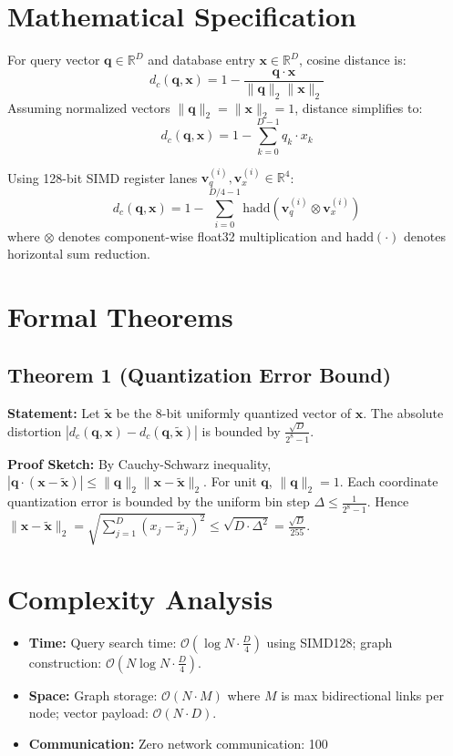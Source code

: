 \documentclass[10pt,journal,compsoc]{IEEEtran}
\begin{document}
\section{Mathematical Specification}
For query vector $\mathbf{q} \in \mathbb{R}^D$ and database entry $\mathbf{x} \in \mathbb{R}^D$, cosine distance is:
$$d_c(\mathbf{q}, \mathbf{x}) = 1 - \frac{\mathbf{q} \cdot \mathbf{x}}{\|\mathbf{q}\|_2 \|\mathbf{x}\|_2}$$
Assuming normalized vectors $\|\mathbf{q}\|_2 = \|\mathbf{x}\|_2 = 1$, distance simplifies to:
$$d_c(\mathbf{q}, \mathbf{x}) = 1 - \sum_{k=0}^{D-1} q_k \cdot x_k$$

Using 128-bit SIMD register lanes $\mathbf{v}_q^{(i)}, \mathbf{v}_x^{(i)} \in \mathbb{R}^4$:
$$d_c(\mathbf{q}, \mathbf{x}) = 1 - \sum_{i=0}^{D/4 - 1} \text{hadd}\left( \mathbf{v}_q^{(i)} \otimes \mathbf{v}_x^{(i)} \right)$$
where $\otimes$ denotes component-wise float32 multiplication and $\text{hadd}(\cdot)$ denotes horizontal sum reduction.

\section{Formal Theorems}
\subsection{Theorem 1 (Quantization Error Bound)}
\textbf{Statement:} Let $\tilde{\mathbf{x}}$ be the 8-bit uniformly quantized vector of $\mathbf{x}$. The absolute distortion $|d_c(\mathbf{q}, \mathbf{x}) - d_c(\mathbf{q}, \tilde{\mathbf{x}})|$ is bounded by $\frac{\sqrt{D}}{2^8 - 1}$.

\textbf{Proof Sketch:} By Cauchy-Schwarz inequality, $|\mathbf{q} \cdot (\mathbf{x} - \tilde{\mathbf{x}})| \le \|\mathbf{q}\|_2 \|\mathbf{x} - \tilde{\mathbf{x}}\|_2$. For unit $\mathbf{q}$, $\|\mathbf{q}\|_2 = 1$. Each coordinate quantization error is bounded by the uniform bin step $\Delta \le \frac{1}{2^8 - 1}$. Hence $\|\mathbf{x} - \tilde{\mathbf{x}}\|_2 = \sqrt{\sum_{j=1}^D (x_j - \tilde{x}_j)^2} \le \sqrt{D \cdot \Delta^2} = \frac{\sqrt{D}}{255}$.


\section{Complexity Analysis}
\begin{itemize}
  \item \textbf{Time:} Query search time: $\mathcal{O}(\log N \cdot \frac{D}{4})$ using SIMD128; graph construction: $\mathcal{O}(N \log N \cdot \frac{D}{4})$.
  \item \textbf{Space:} Graph storage: $\mathcal{O}(N \cdot M)$ where $M$ is max bidirectional links per node; vector payload: $\mathcal{O}(N \cdot D)$.
  \item \textbf{Communication:} Zero network communication: 100%
\end{itemize}
\end{document}
